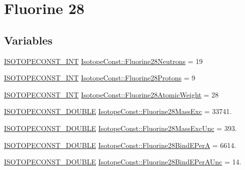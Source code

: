 \hypertarget{group___isotope_const-_fluorine-_f28}{}\section{Fluorine 28}
\label{group___isotope_const-_fluorine-_f28}
\subsection*{Variables}
\begin{DoxyCompactItemize}
\item 
\mbox{\hyperlink{group___isotope_const-_macros_ga5f18360b3e99483a35c32d789e62621c}{I\+S\+O\+T\+O\+P\+E\+C\+O\+N\+S\+T\+\_\+\+I\+NT}} \mbox{\hyperlink{group___isotope_const-_fluorine-_f28_ga1a5ea02af390ccd232a020f1907dba55}{Isotope\+Const\+::\+Fluorine28\+Neutrons}} = 19
\item 
\mbox{\hyperlink{group___isotope_const-_macros_ga5f18360b3e99483a35c32d789e62621c}{I\+S\+O\+T\+O\+P\+E\+C\+O\+N\+S\+T\+\_\+\+I\+NT}} \mbox{\hyperlink{group___isotope_const-_fluorine-_f28_ga0e1fa173104f21df002ce9f46271b2a1}{Isotope\+Const\+::\+Fluorine28\+Protons}} = 9
\item 
\mbox{\hyperlink{group___isotope_const-_macros_ga5f18360b3e99483a35c32d789e62621c}{I\+S\+O\+T\+O\+P\+E\+C\+O\+N\+S\+T\+\_\+\+I\+NT}} \mbox{\hyperlink{group___isotope_const-_fluorine-_f28_gaa76f1731bebf673389387279e14140bd}{Isotope\+Const\+::\+Fluorine28\+Atomic\+Weight}} = 28
\item 
\mbox{\hyperlink{group___isotope_const-_macros_ga8f45a7272ce02c0b4c65c44636ed719a}{I\+S\+O\+T\+O\+P\+E\+C\+O\+N\+S\+T\+\_\+\+D\+O\+U\+B\+LE}} \mbox{\hyperlink{group___isotope_const-_fluorine-_f28_ga99dbc5a99544d2d8442c8fefb44aa2b0}{Isotope\+Const\+::\+Fluorine28\+Mass\+Exc}} = 33741.
\item 
\mbox{\hyperlink{group___isotope_const-_macros_ga8f45a7272ce02c0b4c65c44636ed719a}{I\+S\+O\+T\+O\+P\+E\+C\+O\+N\+S\+T\+\_\+\+D\+O\+U\+B\+LE}} \mbox{\hyperlink{group___isotope_const-_fluorine-_f28_ga500d2582beea399b455ff05090102289}{Isotope\+Const\+::\+Fluorine28\+Mass\+Exc\+Unc}} = 393.
\item 
\mbox{\hyperlink{group___isotope_const-_macros_ga8f45a7272ce02c0b4c65c44636ed719a}{I\+S\+O\+T\+O\+P\+E\+C\+O\+N\+S\+T\+\_\+\+D\+O\+U\+B\+LE}} \mbox{\hyperlink{group___isotope_const-_fluorine-_f28_ga71293ff1501021b2b8c144d0992b0a38}{Isotope\+Const\+::\+Fluorine28\+Bind\+E\+PerA}} = 6614.
\item 
\mbox{\hyperlink{group___isotope_const-_macros_ga8f45a7272ce02c0b4c65c44636ed719a}{I\+S\+O\+T\+O\+P\+E\+C\+O\+N\+S\+T\+\_\+\+D\+O\+U\+B\+LE}} \mbox{\hyperlink{group___isotope_const-_fluorine-_f28_gaaf6f4f9c20ae3f40e74d9b9031ad07ac}{Isotope\+Const\+::\+Fluorine28\+Bind\+E\+Per\+A\+Unc}} = 14.

\end{DoxyCompactItemize}
